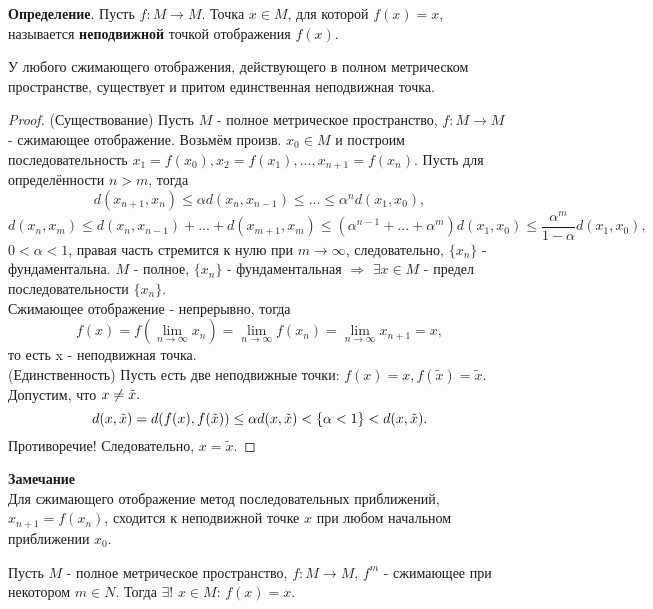 \textbf{Определение}. Пусть $f : M \rightarrow M$. Точка $x \in M$, для которой $f(x) = x$, называется \textbf{неподвижной} точкой отображения $f(x)$.

\begin{theorem}
    У любого сжимающего отображения, действующего в полном метрическом
пространстве, существует и притом единственная неподвижная точка.
\end{theorem}
\begin{proof}
    (Существование)
Пусть $M$ - полное метрическое пространство, $f : M \rightarrow M$ - сжимающее отображение. Возьмём произв. $x_0 \in M$ и построим последовательность $x_1 = f(x_0), x_2 = f(x_1), ..., x_{n+1} = f(x_n)$. Пусть для определённости $n > m$, тогда 
\begin{equation*}
    d(x_{n+1}, x_n) \leq \alpha d(x_n, x_{n-1}) \leq ... \leq \alpha^nd(x_1, x_0),
\end{equation*}
\begin{equation*}
    d(x_n, x_m) \leq d(x_n, x_{n-1}) + ... + d(x_{m+1}, x_m) \leq (\alpha^{n-1}+...+\alpha^m)d(x_1, x_0) \leq \frac{\alpha^m}{1-\alpha}d(x_1,x_0),
\end{equation*}
$0 < \alpha < 1$, правая часть стремится к нулю при $m \rightarrow \infty$, следовательно, $\{x_n\}$ - фундаментальна.
$M$ - полное, $\{x_n\}$ - фундаментальная $\Rightarrow$ $\exists x \in M$ - предел последовательности  $\{x_n\}$. \\
Сжимающее отображение - непрерывно, тогда 
\begin{equation*}
    f(x) = f(\lim\limits_{n \to \infty} x_n) = \lim\limits_{n \to \infty} f(x_n) = \lim\limits_{n \to \infty} x_{n+1} = x,
\end{equation*}
то есть x - неподвижная точка. \\
(Единственность)
Пусть есть две неподвижные точки: $f(x) = x, f(\tilde{x}) = \tilde{x}.$ Допустим, что $x \neq \Tilde{x}.$
\begin{equation*}
    d(x, \Tilde{x}) = d(f(x), f(\Tilde{x})) \leq \alpha d(x, \Tilde{x}) < \{\alpha < 1\} < d(x, \tilde{x}).
\end{equation*}
Противоречие! Следовательно, $x=\tilde{x}$.
\end{proof}
\textbf{Замечание} \\
Для сжимающего отображение метод последовательных приближений,
$x_{n+1} = f(x_n)$, сходится к неподвижной точке $x$ при любом начальном приближении $x_0$.
\begin{theorem}
    Пусть $M$ - полное метрическое пространство, $f : M \rightarrow M$, $f^m$ - сжимающее при некотором $m \in N$. Тогда $\exists!$ $x \in M$: $f(x) = x$.
\end{theorem}
